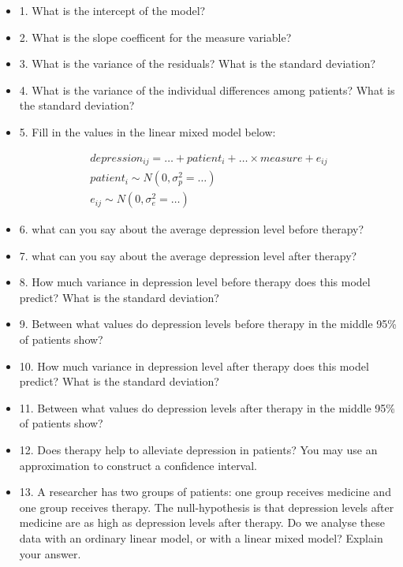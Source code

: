 \documentclass[]{report}\usepackage[]{graphicx}\usepackage[]{color}
\begin{document}
\begin{itemize}
\item 1. What is the intercept of the model?\\
\item 2. What is the slope coefficent for the measure variable?\\
\item 3. What is the variance of the residuals? What is the standard deviation?\\
\item 4. What is the variance of the individual differences among patients? What is the standard deviation?\\
\item 5. Fill in the values in the linear mixed model below:

\begin{eqnarray}
depression_{ij} = \dots + patient_i + \dots \times measure + e_{ij} \\
patient_i \sim N(0, \sigma_p^2 = \dots)\\
e_{ij} \sim N(0, \sigma_e^2 = \dots)
\end{eqnarray}


\item 6. what can you say about the average depression level before therapy? \\
\item 7. what can you say about the average depression level after therapy?\\
\item 8. How much variance in depression level before therapy does this model predict? What is the standard deviation? \\
\item 9. Between what values do depression levels before therapy in the middle 95\% of patients show?\\
\item 10. How much variance in depression level after therapy does this model predict? What is the standard deviation? \\
\item 11. Between what values do depression levels after therapy in the middle 95\% of patients show?\\
\item 12. Does therapy help to alleviate depression in patients? You may use an approximation to construct a confidence interval.

\item 13. A researcher has two groups of patients: one group receives medicine and one group receives therapy. The null-hypothesis is that depression levels after medicine are as high as depression levels after therapy. Do we analyse these data with an ordinary linear model, or with a linear mixed model? Explain your answer.


\end{itemize}
\end{document}
